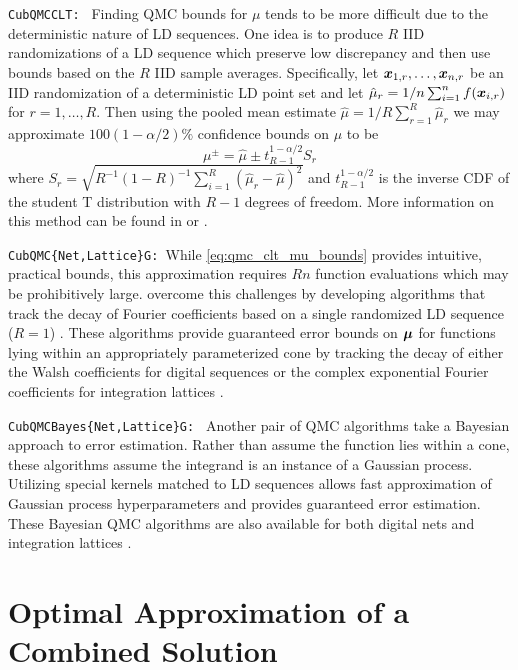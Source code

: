 \documentclass{article}[12pt]
\begin{document}
\texttt{CubQMCCLT: } Finding QMC bounds for $\mu$ tends to be more difficult due to the deterministic nature of LD sequences. One idea is to produce $R$ IID randomizations of a LD sequence which preserve low discrepancy and then use bounds based on the $R$ IID sample averages. Specifically, let $\boldsymbol{x}_{1,r},\dots,\boldsymbol{x}_{n,r}$ be an IID randomization of a deterministic LD point set and let $\hat{\mu}_r = 1/n \sum_{i=1}^n f(\boldsymbol{x}_{i,r})$ for $r=1,\dots,R$. Then using the pooled mean estimate $\hat{\mu} = 1/R \sum_{r=1}^R \hat{\mu}_r$ we may approximate $100(1-\alpha/2)\%$ confidence bounds on $\mu$ to be
\begin{equation}
    \mu^\pm = \hat{\mu} \pm t_{R-1}^{1-\alpha/2}S_r
    \label{eq:qmc_clt_mu_bounds}
\end{equation}
where $S_r = \sqrt{R^{-1}(1-R)^{-1}\sum_{i=1}^R(\hat{\mu}_r - \hat{\mu})^2}$ and $t_{R-1}^{1-\alpha/2}$ is the inverse CDF of the student T distribution with $R-1$ degrees of freedom. More information on this method can be found in \cite[Chapter 17]{mcbook} or \cite{qmc4pde_preprint}.

\texttt{CubQMC\{Net,Lattice\}G: }While \eqref{eq:qmc_clt_mu_bounds} provides intuitive, practical bounds, this approximation requires $Rn$ function evaluations which may be prohibitively large.  \citeauthor{cubqmclattice} overcome this challenges by developing algorithms that track the decay of Fourier coefficients based on a single randomized LD sequence ($R=1$) \cite{adaptive_qmc}. These algorithms provide guaranteed error bounds on $\boldsymbol{\mu}$ for functions lying within an appropriately parameterized cone by tracking the decay of either the Walsh coefficients for digital sequences \cite{cubqmcsobol} or the complex exponential Fourier coefficients for integration lattices \cite{cubqmclattice}.  

\texttt{CubQMCBayes\{Net,Lattice\}G: } Another pair of QMC algorithms take a Bayesian approach to error estimation. Rather than assume the function lies within a cone, these algorithms assume the integrand is an instance of a Gaussian process. Utilizing special kernels matched to LD sequences allows fast approximation of Gaussian process hyperparameters and provides guaranteed error estimation. These Bayesian QMC algorithms are also available for both digital nets  and integration lattices  \cite{cubqmcbayeslattice}.

\section{Optimal Approximation of a Combined Solution}
\end{document}

